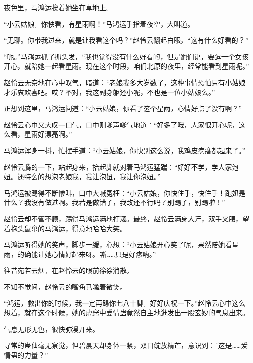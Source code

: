 \begin{this_body}
夜色里，马鸿运挨着她坐在草地上。

“小云姑娘，你快看，有星雨啊！”马鸿运手指着夜空，大叫道。

“无聊。你带我过来，就是让我看这个吗？”赵怜云翻起白眼，“这有什么好看的？”

“呃。”马鸿运抓了抓头发，“我也觉得没有什么好看的，但是她们说，要逗一个女孩开心，就陪她一起看星雨。现在这个时段，咱们北原的夜里，经常能看到星雨呢。”

赵怜云无奈地在心中叹气，暗道：“老娘我多大岁数了，这种事情恐怕只有小姑娘才乐衷欢喜吧。哎？不对，我这副身躯还小呢，不也是一位小姑娘么。”

正想到这里，马鸿运问道：“小云姑娘，你看了这个星雨，心情好点了没有啊？”

赵怜云心中又大叹一口气，口中则嗲声嗲气地道：“好多了哦，人家很开心呢，这么看，星雨好漂亮啊。”

马鸿运浑身一抖，忙摆手道：“小云姑娘，你快别这么说，我鸡皮疙瘩都起来了。”

赵怜云腾的一下，站起身来，抬起脚就对着马鸿运猛踹：“好好不学，学人家泡妞。还特么的想泡老娘我，我让泡妞，我让你泡妞。”

马鸿运被踢得不断惨叫，口中大喊冤枉：“小云姑娘，你快住手，快住手！跑妞是什么？我没有做过啊。我若是做错了，我改还不行吗？别踢了，别踢啦！”

赵怜云却不管不顾，踢得马鸿运满地打滚。最终，赵怜云满身大汗，双手叉腰，望着抱头鼠窜的马鸿运，得意地哈哈大笑。

马鸿运听得她的笑声，脚步一缓，心想：“小云姑娘开心笑了呢，果然陪她看星雨，的确能让她心情好起来呀。嘶……只是好疼呐。”

往昔宛若云烟，在赵怜云的眼前徐徐消散。

不知不觉间，赵怜云的嘴角已噙着微笑。

“鸿运，救出你的时候，我一定再踢你七八十脚，好好庆祝一下。”赵怜云心中这么想着，就在这个时候，她的虚窍中爱情蛊竟然自主地迸发出一股玄妙的气息出来。

气息无形无色，很快弥漫开来。

寻常的蛊仙毫无察觉，但碧晨天却身体一紧，双目绽放精芒，意识到：“这是……爱情蛊的力量？”

\end{this_body}

